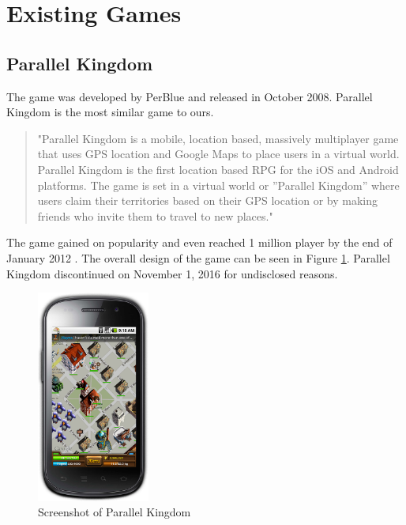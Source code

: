 
\section{Existing Games}

	\subsection{Parallel Kingdom}
	The game was developed by PerBlue and released in October 2008. Parallel Kingdom is the most similar game to ours.
		
	\begin{quote}
	"Parallel Kingdom is a mobile, location based, massively multiplayer game that uses GPS location and Google Maps to place users in a virtual world. Parallel Kingdom is the first location based RPG for the iOS and Android platforms. The game is set in a virtual world or ”Parallel Kingdom” where users claim their territories based on their GPS location or by making friends who invite them to travel to new places."
	\end{quote} \cite{parallelkingdom}
	
	The game gained on popularity and even reached 1 million player by the end of January 2012 \cite{parallelkingdom1m}. The overall design of the game can be seen in Figure \ref{fig:parallelkingdom}. Parallel Kingdom discontinued on November 1, 2016 for undisclosed reasons.
	
	\begin{figure}[h]	
		\includegraphics[width=0.33\textwidth]{figures/parallelkingdom}
		\centering			
		\caption{Screenshot of Parallel Kingdom \cite{parallelkingdomscreen}}
		\label{fig:parallelkingdom}
	\end{figure}
	

